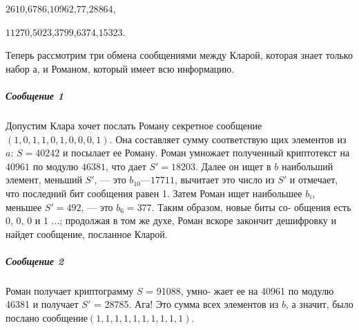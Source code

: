 \documentclass{../template/mai_book}
\begin{document}
\begin{center}
$2 610$,\;\;\;\;$6 786$,\;\;\;\;$10 962$,\;\;\;\;$77$,\;\;\;\;$28 864$,

$11 270$,\;\;\;\;$5 023$,\;\;\;\;$3 799$,\;\;\;\;$6 374$,\;\;\;\;$15 323$.
\end{center}
\noindent Теперь рассмотрим три обмена сообщениями между Кларой, которая\linebreak
знает только набор $а$, и Романом, который имеет всю информацию.
\pagebreak
\subparagraph{Сообщение 1}
Допустим Клара хочет послать Роману секретное\linebreak
сообщение $(1,0,1,1,0,1,0,0,0,1)$. Она составляет сумму соответствую­\linebreak
щих элементов из $a$: $S = 40 242$ и посылает ее Роману.\linebreak
Роман умножает полученный криптотекст на $40961$ по модулю\linebreak
$46381$, что дает $S' = 18203$. Далее он ищет в $b$ наибольший элемент,\linebreak
меньший $S'$, — это $b_10 — 17711$, вычитает это число из $S'$ и отмечает,\linebreak
что последний бит сообщения равен 1. Затем Роман ищет наибольшее\linebreak
$b_i$, меньшее $S' = 492$, — это $b_6 = 377$. Таким образом, новые биты со­-\linebreak
общения есть $0$, $0$, $0$ и $1$ ...; продолжая в том же духе, Роман вскоре\linebreak
закончит дешифровку и найдет сообщение, посланное Кларой.

\subparagraph{Сообщение 2}
Роман получает криптограмму $S$ = 91088, умно­-\linebreak
жает ее на 40961 по модулю 46381 и получает $S'$ = 28785. Ага!\linebreak
Это сумма всех элементов из $b$, а значит, было послано сообщение\linebreak$
(1,1,1,1,1,1,1,1,1,1)$.
\end{document}

